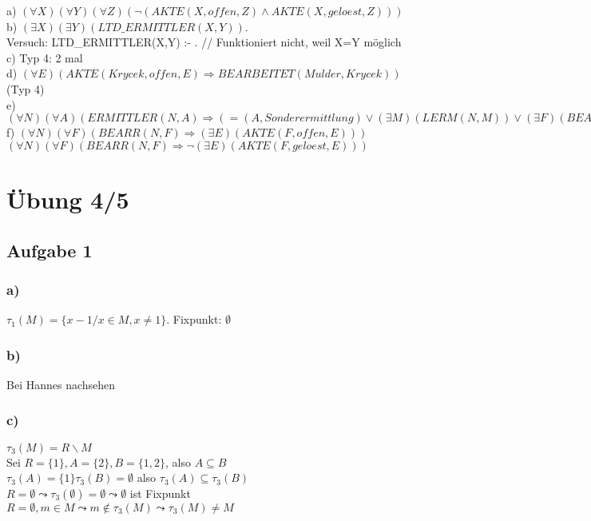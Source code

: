 \documentclass[12pt, a4paper]{article}
\begin{document}
a) $(\forall X)(\forall Y)(\forall Z)(\lnot (AKTE(X, offen, Z) \wedge AKTE(X, geloest, Z)))$ \\
b) $(\exists X)(\exists Y)(LTD\_ERMITTLER(X,Y))$. \\
Versuch: LTD\_ERMITTLER(X,Y) :- . // Funktioniert nicht, weil X=Y möglich \\
c) Typ 4: 2 mal \\
d) $(\forall E)(AKTE(Krycek, offen, E) \Rightarrow BEARBEITET(Mulder, Krycek))$ (Typ 4) \\
e) $(\forall N)(\forall A)(ERMITTLER(N, A) \Rightarrow (=(A, Sonderermittlung) \vee (\exists M)(LERM(N,M)) \vee (\exists F)(BEARBEITET(N, F))))$
f) $(\forall N) (\forall F)(BEARR(N,F) \Rightarrow (\exists E) (AKTE(F, offen, E)))$ \\
$(\forall N) (\forall F)(BEARR(N,F) \Rightarrow \lnot(\exists E) (AKTE(F, geloest, E)))$

\section*{Übung 4/5}

\subsection*{Aufgabe 1}
\subsubsection*{a)}

$\tau_1(M) = \{x - 1 / x \in M, x \neq 1\}$. Fixpunkt: $\emptyset$

\subsubsection*{b)}
Bei Hannes nachsehen

\subsubsection*{c)}
$\tau_3(M) = R \backslash M$ \\
Sei $R = \{ 1 \}, A = \{ 2 \}, B = \{ 1,2 \}$, also $A \subseteq B$ \\
$\tau_3(A) = \{ 1\} \tau_3(B) = \emptyset$ also $\tau_3(A) \subseteq \tau_3(B)$ \\
$R = \emptyset \leadsto \tau_3(\emptyset) = \emptyset \leadsto \emptyset$ ist Fixpunkt  \\
$R = \emptyset, m \in M \leadsto m \not\in \tau_3(M) \leadsto \tau_3(M) \neq M$
\end{document}
